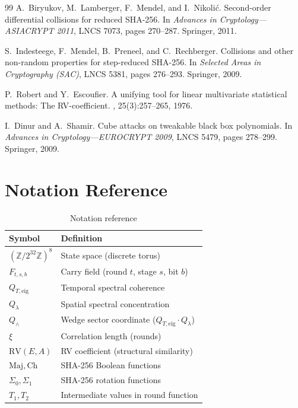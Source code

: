 \documentclass[11pt,a4paper]{article}
\theoremstyle{plain}
\theoremstyle{definition}
\theoremstyle{remark}
\newcommand{\Z}{\mathbb{Z}}
\newcommand{\Maj}{\mathrm{Maj}}
\newcommand{\Ch}{\mathrm{Ch}}
\newcommand{\Qwedge}{Q_{\wedge}}
\newcommand{\Qlambda}{Q_{\lambda}}
\newcommand{\Qteig}{Q_{T,\mathrm{eig}}}
\begin{document}
\begin{thebibliography}{99}
A.~Biryukov, M.~Lamberger, F.~Mendel, and I.~Nikoli\'{c}.
\newblock Second-order differential collisions for reduced SHA-256.
\newblock In {\em Advances in Cryptology---ASIACRYPT 2011}, LNCS 7073, pages 270--287. Springer, 2011.

S.~Indesteege, F.~Mendel, B.~Preneel, and C.~Rechberger.
\newblock Collisions and other non-random properties for step-reduced SHA-256.
\newblock In {\em Selected Areas in Cryptography (SAC)}, LNCS 5381, pages 276--293. Springer, 2009.

P.~Robert and Y.~Escoufier.
\newblock A unifying tool for linear multivariate statistical methods: The RV-coefficient.
, 25(3):257--265, 1976.

I.~Dinur and A.~Shamir.
\newblock Cube attacks on tweakable black box polynomials.
\newblock In {\em Advances in Cryptology---EUROCRYPT 2009}, LNCS 5479, pages 278--299. Springer, 2009.

\end{thebibliography}

\appendix

\section{Notation Reference}

\begin{table}[h]
\centering
\begin{tabular}{ll}
\toprule
Symbol & Definition \\
\midrule
$(\Z/2^{32}\Z)^8$ & State space (discrete torus) \\
$F_{t,s,b}$ & Carry field (round $t$, stage $s$, bit $b$) \\
$\Qteig$ & Temporal spectral coherence \\
$\Qlambda$ & Spatial spectral concentration \\
$\Qwedge$ & Wedge sector coordinate ($\Qteig \cdot \Qlambda$) \\
$\xi$ & Correlation length (rounds) \\
$\mathrm{RV}(E, A)$ & RV coefficient (structural similarity) \\
$\Maj, \Ch$ & SHA-256 Boolean functions \\
$\Sigma_0, \Sigma_1$ & SHA-256 rotation functions \\
$T_1, T_2$ & Intermediate values in round function \\
\bottomrule
\end{tabular}
\caption{Notation reference}
\end{table}
\end{document}
